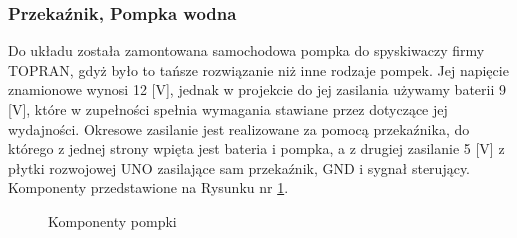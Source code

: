 \documentclass[12pt]{article}
\begin{document}
\subsubsection{Przekaźnik, Pompka wodna}
Do układu została zamontowana samochodowa pompka do spyskiwaczy firmy TOPRAN, gdyż było to tańsze rozwiązanie niż inne rodzaje pompek. Jej napięcie znamionowe wynosi 12 [V], jednak w projekcie do jej zasilania używamy baterii 9 [V], które w zupełności spełnia wymagania stawiane przez dotyczące jej wydajności. Okresowe zasilanie jest realizowane za pomocą przekaźnika, do którego z jednej strony wpięta jest bateria i pompka, a z drugiej zasilanie 5 [V] z płytki rozwojowej UNO zasilające sam przekaźnik, GND i sygnał sterujący. Komponenty przedstawione na Rysunku nr \ref{fig:komponenty}.




\begin{figure}[!h]
\centering
{}
\quad
{}
\quad
{}
\caption{Komponenty pompki}
\label{fig:komponenty}

\end{figure}
\end{document}
